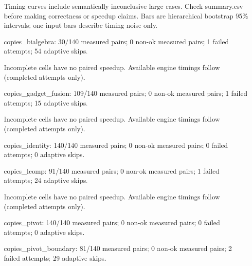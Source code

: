 \documentclass{article}
\begin{document}
\noindent Timing curves include semantically inconclusive large cases. Check summary.csv before making correctness or speedup claims. Bars are hierarchical bootstrap 95\% intervals; one-input bars describe timing noise only.

\quad
\par\medskip
\noindent copies\_bialgebra: 30/140 measured pairs; 0 non-ok measured pairs; 1 failed attempts; 54 adaptive skips.\par
\noindent Incomplete cells have no paired speedup. Available engine timings follow (completed attempts only).\par\par\medskip
\quad
\par\medskip
\noindent copies\_gadget\_fusion: 109/140 measured pairs; 0 non-ok measured pairs; 1 failed attempts; 15 adaptive skips.\par
\noindent Incomplete cells have no paired speedup. Available engine timings follow (completed attempts only).\par\par\medskip
\quad
\par\medskip
\noindent copies\_identity: 140/140 measured pairs; 0 non-ok measured pairs; 0 failed attempts; 0 adaptive skips.\par
\quad
\par\medskip
\noindent copies\_lcomp: 91/140 measured pairs; 0 non-ok measured pairs; 1 failed attempts; 24 adaptive skips.\par
\noindent Incomplete cells have no paired speedup. Available engine timings follow (completed attempts only).\par\par\medskip
\quad
\par\medskip
\noindent copies\_pivot: 140/140 measured pairs; 0 non-ok measured pairs; 0 failed attempts; 0 adaptive skips.\par
\quad
\par\medskip
\noindent copies\_pivot\_boundary: 81/140 measured pairs; 0 non-ok measured pairs; 2 failed attempts; 29 adaptive skips.\par
\end{document}
